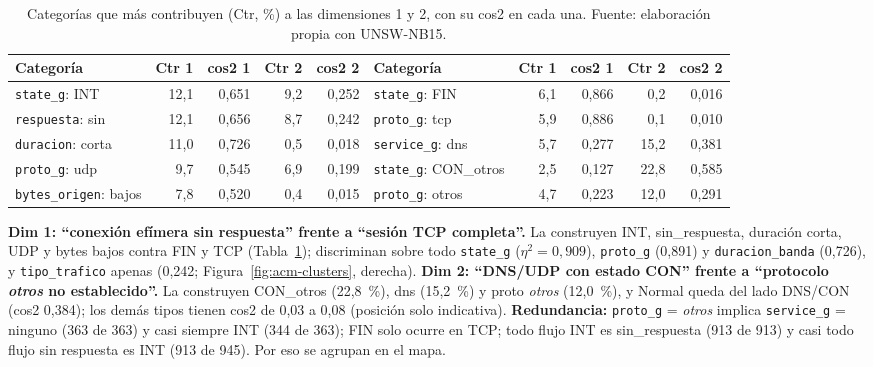 \begin{table}[htbp]
  \centering
  \caption[Contribuciones y cos2 de las categorías del ACM]{Categorías que más contribuyen (Ctr, \%) a las dimensiones 1 y 2, con su cos2 en cada una. Fuente: elaboración propia con UNSW-NB15.}\label{tab:acm-contrib}
  \begin{tablacompacta}
  \footnotesize\setlength{\tabcolsep}{4pt}
  \begin{tabular}{@{}lrrrr@{\hspace{0.8cm}}lrrrr@{}}
    \toprule
    Categoría & Ctr 1 & cos2 1 & Ctr 2 & cos2 2 & Categoría & Ctr 1 & cos2 1 & Ctr 2 & cos2 2 \\
    \midrule
    \texttt{state\_g}: INT & 12,1 & 0,651 & 9,2 & 0,252 & \texttt{state\_g}: FIN & 6,1 & 0,866 & 0,2 & 0,016 \\
    \texttt{respuesta}: sin & 12,1 & 0,656 & 8,7 & 0,242 & \texttt{proto\_g}: tcp & 5,9 & 0,886 & 0,1 & 0,010 \\
    \texttt{duracion}: corta & 11,0 & 0,726 & 0,5 & 0,018 & \texttt{service\_g}: dns & 5,7 & 0,277 & 15,2 & 0,381 \\
    \texttt{proto\_g}: udp & 9,7 & 0,545 & 6,9 & 0,199 & \texttt{state\_g}: CON\_otros & 2,5 & 0,127 & 22,8 & 0,585 \\
    \texttt{bytes\_origen}: bajos & 7,8 & 0,520 & 0,4 & 0,015 & \texttt{proto\_g}: otros & 4,7 & 0,223 & 12,0 & 0,291 \\
    \bottomrule
  \end{tabular}
  \end{tablacompacta}
\end{table}

\textbf{Dim 1: ``conexión efímera sin respuesta'' frente a ``sesión TCP completa''.} La construyen INT, sin\_respuesta, duración corta, UDP y bytes bajos contra FIN y TCP (Tabla~\ref{tab:acm-contrib}); discriminan sobre todo \texttt{state\_g} ($\eta^2 = 0{,}909$), \texttt{proto\_g} (0,891) y \texttt{duracion\_banda} (0,726), y \texttt{tipo\_trafico} apenas (0,242; Figura~\ref{fig:acm-clusters}, derecha). \textbf{Dim 2: ``DNS/UDP con estado CON'' frente a ``protocolo \emph{otros} no establecido''.} La construyen CON\_otros (22,8~\%), dns (15,2~\%) y proto \emph{otros} (12,0~\%), y Normal queda del lado DNS/CON (cos2 0,384); los demás tipos tienen cos2 de 0,03 a 0,08 (posición solo indicativa). \textbf{Redundancia:} \texttt{proto\_g} = \emph{otros} implica \texttt{service\_g} = ninguno (363 de 363) y casi siempre INT (344 de 363); FIN solo ocurre en TCP; todo flujo INT es sin\_respuesta (913 de 913) y casi todo flujo sin respuesta es INT (913 de 945). Por eso se agrupan en el mapa.

